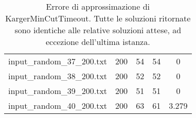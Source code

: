 \begin{table}[H]
\begin{tabular}{lrccc}
     input\_random\_37\_200.txt &     200 &        54 &                 54 &           0     \\
     input\_random\_38\_200.txt &     200 &        52 &                 52 &           0     \\
     input\_random\_39\_200.txt &     200 &        51 &                 51 &           0     \\
     \rowcolor{red!25} input\_random\_40\_200.txt &     200 &        63 &                 61 &           3.279\\
     \hline
    \end{tabular}

    \caption{Errore di approssimazione di KargerMinCutTimeout. Tutte le soluzioni ritornate sono identiche alle relative soluzioni attese, ad eccezione dell'ultima istanza.}
    \label{table:kargertimeout-approx-error}
\end{table}
